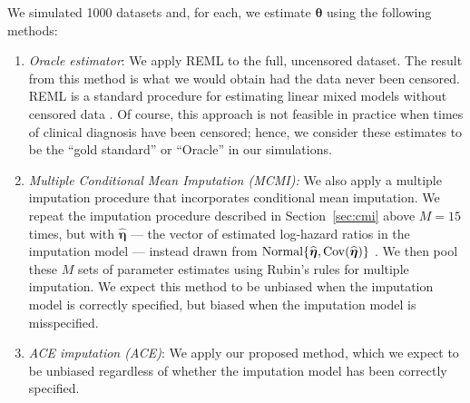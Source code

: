 \documentclass[12pt]{article}
\def\Normal{\hbox{Normal}}
\def\btheta{{\boldsymbol{\theta}}}
\begin{document}
We simulated 1000 datasets and, for each, we estimate $\btheta$ using the following methods: %
\begin{enumerate}
    \item \emph{Oracle estimator}: We apply REML to the full, uncensored dataset. The result from this method is what we would obtain had the data never been censored. REML is a standard procedure for estimating linear mixed models without censored data \citep{ALA}. Of course, this approach is not feasible in practice when times of clinical diagnosis have been censored; hence, we consider these estimates to be the ``gold standard'' or ``Oracle'' in our simulations. 
    \item \emph{Multiple Conditional Mean Imputation (MCMI):} We also apply a multiple imputation procedure that incorporates conditional mean imputation. We repeat the imputation procedure described in Section~\ref{sec:cmi} above $M=15$ times, but with $\widehat{\boldsymbol{\eta}}$ --- the vector of estimated log-hazard ratios in the imputation model --- instead drawn from  $\Normal\{\widehat{\boldsymbol{\eta}}, {\rm Cov}(\widehat{\boldsymbol{\eta}})\}$ \citep{cole2006multiple}. We then pool these $M$ sets of parameter estimates using Rubin's rules for multiple imputation. We expect this method to be unbiased when the imputation model is correctly specified, but biased when the imputation model is misspecified.
    \item \emph{ACE imputation (ACE)}: We apply our proposed method, which we expect to be unbiased regardless of whether the imputation model has been correctly specified.
\end{enumerate}


\end{document}
